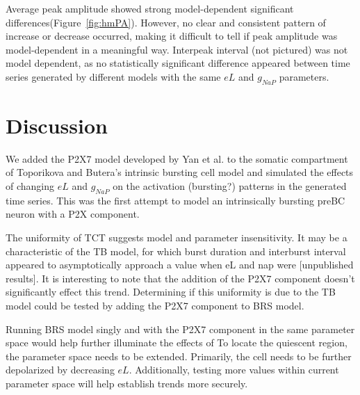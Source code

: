 \documentclass[11pt]{article}
\begin{document}
Average peak amplitude showed strong model-dependent significant differences(Figure~\ref{fig:hmPA}). However, no clear and consistent pattern of increase or decrease occurred, making it difficult to tell if peak amplitude was model-dependent in a meaningful way. Interpeak interval (not pictured) was not model dependent, as no statistically significant difference appeared between time series generated by different models with the same $eL$ and $g_{NaP}$ parameters.



%



%
\FloatBarrier
\section{Discussion}

We added the P2X7 model developed by Yan et al. to the somatic compartment of Toporikova and Butera's intrinsic bursting cell model and simulated the effects of changing $eL$ and $g_{NaP}$ on the activation (bursting?) patterns  in the generated time series. This was the first attempt to model an intrinsically bursting preBC neuron with a P2X component.

The uniformity of TCT suggests model and parameter insensitivity. It may be a characteristic of the TB model, for which burst duration and interburst interval appeared to asymptotically approach a value when eL and nap were [unpublished results]. It is interesting to note that the addition of the P2X7 component doesn't significantly effect this trend. Determining if this uniformity is due to the TB model could be tested by adding the P2X7 component to BRS model. 

Running BRS model singly and with the P2X7 component in the same parameter space would help further illuminate the effects of 
To locate the quiescent region, the parameter space needs to be extended. Primarily, the cell needs to be further depolarized by decreasing $eL$.
Additionally, testing more values within current parameter space  will help establish trends more securely.
\end{document}
